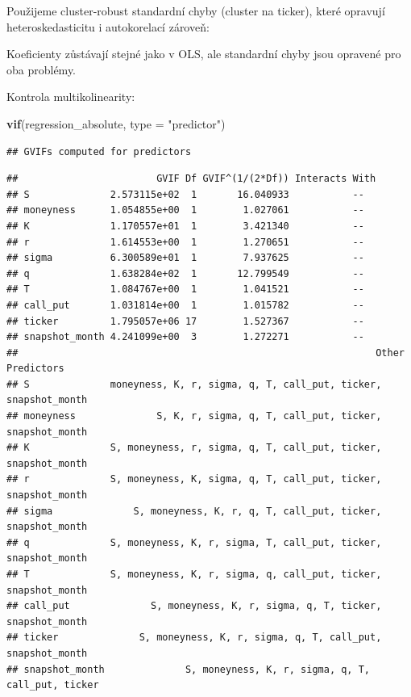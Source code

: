 \documentclass[
]{article}
\newenvironment{Shaded}{\begin{snugshade}}{\end{snugshade}}
\newcommand{\AttributeTok}[1]{\textcolor[rgb]{0.13,0.29,0.53}{#1}}
\newcommand{\FunctionTok}[1]{\textcolor[rgb]{0.13,0.29,0.53}{\textbf{#1}}}
\newcommand{\NormalTok}[1]{#1}
\newcommand{\StringTok}[1]{\textcolor[rgb]{0.31,0.60,0.02}{#1}}
\begin{document}
Použijeme cluster-robust standardní chyby (cluster na ticker), které
opravují heteroskedasticitu i autokorelací zároveň:

Koeficienty zůstávají stejné jako v OLS, ale standardní chyby jsou
opravené pro oba problémy.

Kontrola multikolinearity:

\begin{Shaded}
\begin{Highlighting}[]
\FunctionTok{vif}\NormalTok{(regression\_absolute, }\AttributeTok{type =} \StringTok{"predictor"}\NormalTok{)}
\end{Highlighting}
\end{Shaded}

\begin{verbatim}
## GVIFs computed for predictors
\end{verbatim}

\begin{verbatim}
##                        GVIF Df GVIF^(1/(2*Df)) Interacts With
## S              2.573115e+02  1       16.040933           --  
## moneyness      1.054855e+00  1        1.027061           --  
## K              1.170557e+01  1        3.421340           --  
## r              1.614553e+00  1        1.270651           --  
## sigma          6.300589e+01  1        7.937625           --  
## q              1.638284e+02  1       12.799549           --  
## T              1.084767e+00  1        1.041521           --  
## call_put       1.031814e+00  1        1.015782           --  
## ticker         1.795057e+06 17        1.527367           --  
## snapshot_month 4.241099e+00  3        1.272271           --  
##                                                              Other Predictors
## S              moneyness, K, r, sigma, q, T, call_put, ticker, snapshot_month
## moneyness              S, K, r, sigma, q, T, call_put, ticker, snapshot_month
## K              S, moneyness, r, sigma, q, T, call_put, ticker, snapshot_month
## r              S, moneyness, K, sigma, q, T, call_put, ticker, snapshot_month
## sigma              S, moneyness, K, r, q, T, call_put, ticker, snapshot_month
## q              S, moneyness, K, r, sigma, T, call_put, ticker, snapshot_month
## T              S, moneyness, K, r, sigma, q, call_put, ticker, snapshot_month
## call_put              S, moneyness, K, r, sigma, q, T, ticker, snapshot_month
## ticker              S, moneyness, K, r, sigma, q, T, call_put, snapshot_month
## snapshot_month              S, moneyness, K, r, sigma, q, T, call_put, ticker
\end{verbatim}
\end{document}
